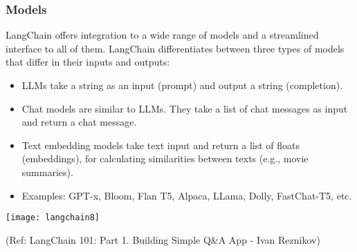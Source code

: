 \begin{frame}[fragile]\frametitle{Models}

LangChain offers integration to a wide range of models and a streamlined interface to all of them. LangChain differentiates between three types of models that differ in their inputs and outputs:

\begin{itemize}
\item LLMs take a string as an input (prompt) and output a string (completion).
\item Chat models are similar to LLMs. They take a list of chat messages as input and return a chat message.
\item Text embedding models take text input and return a list of floats (embeddings), for calculating similarities between texts (e.g., movie summaries).
\item Examples: GPT-x, Bloom, Flan T5, Alpaca, LLama, Dolly, FastChat-T5, etc.
\end{itemize}

\begin{center}
\texttt{[image: langchain8]}
\end{center}	  


{\tiny (Ref: LangChain 101: Part 1. Building Simple Q\&A App - Ivan Reznikov)}

\end{frame}

